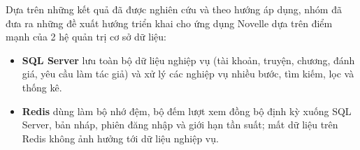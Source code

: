 Dựa trên những kết quả đã được nghiên cứu và theo hướng áp dụng, nhóm đã đưa ra những đề xuất hướng triển khai cho ứng dụng Novelle dựa trên điểm mạnh của 2 hệ quản trị cơ sở dữ liệu:

\begin{itemize}
    \item \textbf{SQL Server} lưu toàn bộ dữ liệu nghiệp vụ (tài khoản, truyện, chương, đánh giá, yêu cầu làm tác giả) và xử lý các nghiệp vụ nhiều bước, tìm kiếm, lọc và thống kê.
    \item \textbf{Redis} dùng làm bộ nhớ đệm, bộ đếm lượt xem đồng bộ định kỳ xuống SQL Server, bản nháp, phiên đăng nhập và giới hạn tần suất; mất dữ liệu trên Redis không ảnh hưởng tới dữ liệu nghiệp vụ.
\end{itemize}
